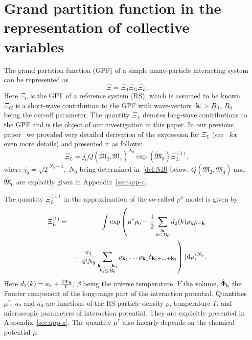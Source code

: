 \section{\label{sec:init-gpf} Grand partition function in the representation of collective variables}
The grand partition function (GPF) of a simple many-particle interacting system can be represented as~\cite{Yukh1990,YukhJSP1995,RomaJPS2024}
\begin{equation}
	\label{Xi_as_prod}
	\Xi = \Xi_0\Xi_G\Xi_L.
\end{equation}
Here $\Xi_0$ is the GPF of a reference system (RS), which is assumed to be known. $\Xi_G$ is a short-wave contribution to the GPF with wave-vectors $\abs{\vb{k}}>B_0$, $B_0$ being the cut-off parameter.
The quantity $\Xi_L$ denotes long-wave contributions to the GPF and is the object of our investigation in this paper. In our previous paper~\cite{RomaJPS2024} we provided very detailed derivation of the expression for $\Xi_L$ (see~\cite{Roma2023Preprint} for even more details) and presented it as follows:
\begin{equation}
	\label{Xi_L}
	\Xi_L = j_0Q(\tilde{\mathfrak{M}_2}, \mathfrak{M}_4)^{N_0} \exp(\tilde{\mathfrak{M}}_0) \Xi_L^{(1)},
\end{equation} 
where $j_0=\sqrt{2}^{N_0 - 1},$ $N_0$ being determined in~\eqref{def:NB} below, $Q(\tilde{\mathfrak{M}_2}, \mathfrak{M}_4)$ and $\tilde{\mathfrak{M}_0}$ are explicitly given in Appendix~\ref{sec:app-a}.

The quantity $\Xi_L^{(1)}$ in the approximation of the so-called $\rho^4$ model is given by
\begin{eqnarray}
	\label{Xi_L_1}
	\Xi_L^{(1)} &=& 
	\int \exp\left(
	\mu^* \rho_0 - \frac{1}{2} \sum_{\substack{\vb k \\ k \leq B_0}} d_2(k) \rho_{\vb k} \rho_{-\vb k} 
	\right.\\
	&& -\left. \frac{a_4}{4! N_0} \sum_{\substack{\vb k_1, \dotsc, \vb k_4 \\ k_i \leq B_0}} \rho_{\vb k_1} \dotsc \rho_{\vb k_4} \delta_{\vb{k}_1 + \dotsc + \vb{k}_4} \right) ({\rm d} \rho)^{N_0}
	\nonumber.
\end{eqnarray}
Here $d_2(k) = a_2 + \frac{\beta\hat{\Phi}_{\vb k}}{V}$, $\beta$ being the inverse temperature, $V$ the volume, $\hat{\Phi}_{\vb k}$ the Fourier component of the long-range part of the interaction potential.
Quantities $\mu^*$, $a_2$ and $a_4$ are functions of the RS particle density $\rho$, temperature $T$, and microscopic parameters of interaction potential. They are explicitly presented in Appendix~\ref{sec:app-a}. The quantity $\mu^*$ also linearly depends on the chemical potential $\mu$.

